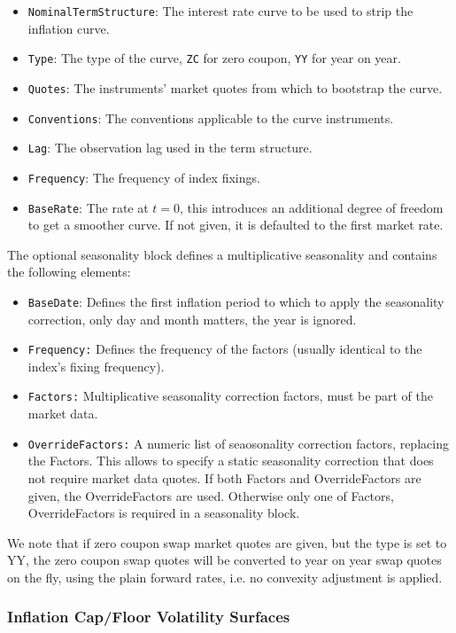 \documentclass[12pt, a4paper]{article}
\begin{document}
{{\begin{itemize}
\item {\tt NominalTermStructure}: The interest rate curve to be used to strip the inflation curve.
\item {\tt Type}: The type of the curve, {\tt ZC} for zero coupon, {\tt YY} for year on year.
\item {\tt Quotes}: The instruments' market quotes from which to bootstrap the curve.
\item {\tt Conventions}: The conventions applicable to the curve instruments.
\item {\tt Lag}: The observation lag used in the term structure.
\item {\tt Frequency}: The frequency of index fixings.
\item {\tt BaseRate}: The rate at $t=0$, this introduces an additional degree of freedom to get a smoother curve. If not
  given, it is defaulted to the first market rate.
\end{itemize}

The optional seasonality block defines a multiplicative seasonality and contains the following elements:

\begin{itemize}
\item {\tt BaseDate}: Defines the first inflation period to which to apply the seasonality correction, only day and
  month matters, the year is ignored.
\item {\tt Frequency:} Defines the frequency of the factors (usually identical to the index's fixing frequency).
\item {\tt Factors:} Multiplicative seasonality correction factors, must be part of the market data.
\item {\tt OverrideFactors:} A numeric list of seaosonality correction factors, replacing the Factors. This allows to
  specify a static seasonality correction that does not require market data quotes. If both Factors and OverrideFactors
  are given, the OverrideFactors are used. Otherwise only one of Factors, OverrideFactors is required in a seasonality
  block.
\end{itemize}

We note that if zero coupon swap market quotes are given, but the type is set to YY, the zero coupon swap quotes will be
converted to year on year swap quotes on the fly, using the plain forward rates, i.e. no convexity adjustment is
applied.

\subsubsection{Inflation Cap/Floor Volatility Surfaces}

}}
\end{document}
